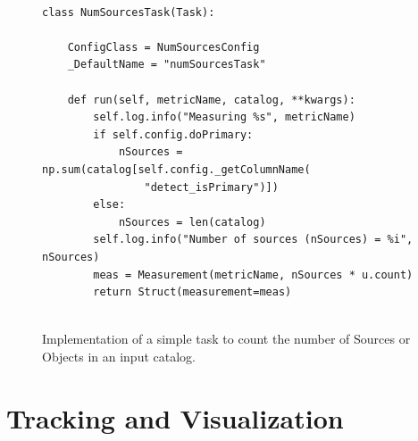 \begin{figure}[ht]
  \begin{center}
  \lstset{language=python}
  \begin{lstlisting}
  
class NumSourcesTask(Task):

    ConfigClass = NumSourcesConfig
    _DefaultName = "numSourcesTask"

    def run(self, metricName, catalog, **kwargs):
        self.log.info("Measuring %s", metricName)
        if self.config.doPrimary:
            nSources = np.sum(catalog[self.config._getColumnName(
                "detect_isPrimary")])
        else:
            nSources = len(catalog)
        self.log.info("Number of sources (nSources) = %i", nSources)
        meas = Measurement(metricName, nSources * u.count)
        return Struct(measurement=meas)
  
    \end{lstlisting}
    \end{center}
  \caption{\label{fig:num_sources_task}
  Implementation of a simple task to count the number of Sources or Objects in an input catalog. }
  \par\medskip
\end{figure}

\section{Tracking and Visualization} \label{sec:tracking}


